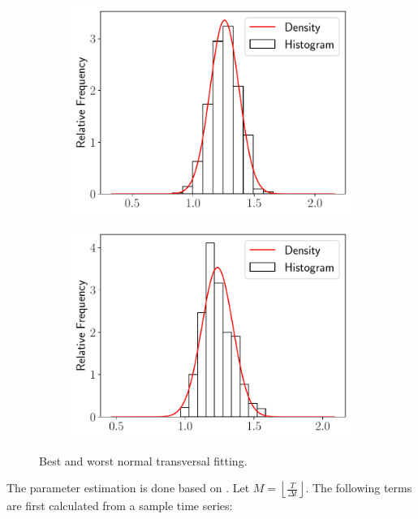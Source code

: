 \documentclass[11pt]{article}
\theoremstyle{definition}
\theoremstyle{remark}
\theoremstyle{remark}
\begin{document}
\begin{figure}[H]
  \centering
  \begin{subfigure}[b]{0.45\textwidth}
    \centering
    \includegraphics[scale=.45]{maxp_histogram_forallT}
  \end{subfigure}
    \begin{subfigure}[b]{0.45\textwidth}
    \centering
    \includegraphics[scale=.45]{minp_histogram_forallT}
  \end{subfigure}
  \caption{Best and worst normal transversal fitting.}
  \label{fig:hist_norm2}
\end{figure}

The parameter estimation is done based on \cite{marin2013}.
Let $M = \left\lfloor \frac{T}{\Delta t} \right\rfloor$. The following terms
are first calculated from a sample time series:
\end{document}
